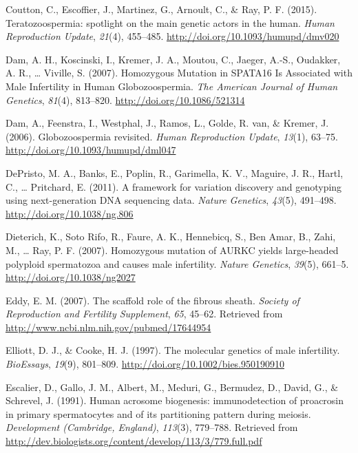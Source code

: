 \documentclass[12pt,twoside]{reedthesis}
\theoremstyle{definition}
\theoremstyle{definition}
\theoremstyle{remark}
\begin{document}
  \hypertarget{ref-Coutton2015}{}
  Coutton, C., Escoffier, J., Martinez, G., Arnoult, C., \& Ray, P. F.
  (2015). Teratozoospermia: spotlight on the main genetic actors in the
  human. \emph{Human Reproduction Update}, \emph{21}(4), 455--485.
  \url{http://doi.org/10.1093/humupd/dmv020}
  
  \hypertarget{ref-Dam2007a}{}
  Dam, A. H., Koscinski, I., Kremer, J. A., Moutou, C., Jaeger, A.-S.,
  Oudakker, A. R., \ldots{} Viville, S. (2007). Homozygous Mutation in
  SPATA16 Is Associated with Male Infertility in Human Globozoospermia.
  \emph{The American Journal of Human Genetics}, \emph{81}(4), 813--820.
  \url{http://doi.org/10.1086/521314}
  
  \hypertarget{ref-Dam2006}{}
  Dam, A., Feenstra, I., Westphal, J., Ramos, L., Golde, R. van, \&
  Kremer, J. (2006). Globozoospermia revisited. \emph{Human Reproduction
  Update}, \emph{13}(1), 63--75.
  \url{http://doi.org/10.1093/humupd/dml047}
  
  \hypertarget{ref-DePristo2011}{}
  DePristo, M. A., Banks, E., Poplin, R., Garimella, K. V., Maguire, J.
  R., Hartl, C., \ldots{} Pritchard, E. (2011). A framework for variation
  discovery and genotyping using next-generation DNA sequencing data.
  \emph{Nature Genetics}, \emph{43}(5), 491--498.
  \url{http://doi.org/10.1038/ng.806}
  
  \hypertarget{ref-Dieterich2007}{}
  Dieterich, K., Soto Rifo, R., Faure, A. K., Hennebicq, S., Ben Amar, B.,
  Zahi, M., \ldots{} Ray, P. F. (2007). Homozygous mutation of AURKC
  yields large-headed polyploid spermatozoa and causes male infertility.
  \emph{Nature Genetics}, \emph{39}(5), 661--5.
  \url{http://doi.org/10.1038/ng2027}
  
  \hypertarget{ref-Eddy2007}{}
  Eddy, E. M. (2007). The scaffold role of the fibrous sheath.
  \emph{Society of Reproduction and Fertility Supplement}, \emph{65},
  45--62. Retrieved from \url{http://www.ncbi.nlm.nih.gov/pubmed/17644954}
  
  \hypertarget{ref-Elliott1997}{}
  Elliott, D. J., \& Cooke, H. J. (1997). The molecular genetics of male
  infertility. \emph{BioEssays}, \emph{19}(9), 801--809.
  \url{http://doi.org/10.1002/bies.950190910}
  
  \hypertarget{ref-Escalier1991}{}
  Escalier, D., Gallo, J. M., Albert, M., Meduri, G., Bermudez, D., David,
  G., \& Schrevel, J. (1991). Human acrosome biogenesis: immunodetection
  of proacrosin in primary spermatocytes and of its partitioning pattern
  during meiosis. \emph{Development (Cambridge, England)}, \emph{113}(3),
  779--788. Retrieved from
  \url{http://dev.biologists.org/content/develop/113/3/779.full.pdf}
  
\end{document}
